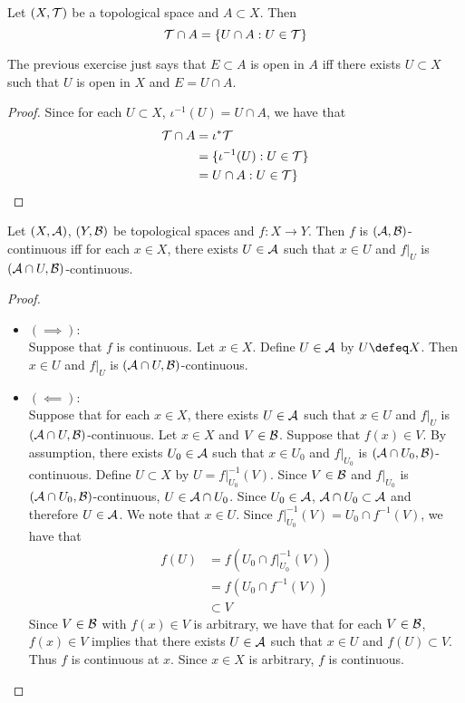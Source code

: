 \documentclass{book}
\begin{document}
\begin{ex}
	Let $(X, \mathcal{T})$ be a topological space and $A \subset X$. Then $$\mathcal{T} \cap A = \{U \cap A: U \in \mathcal{T}\}$$
\end{ex}

\begin{note}
	The previous exercise just says that $E \subset A$ is open in $A$ iff there exists $U \subset X$ such that $U$ is open in $X$ and $E = U \cap A$. 
\end{note}

\begin{proof}
	Since for each $U \subset X$, $\iota^{-1}(U) = U \cap A$, we have that 
	\begin{align*}
		\mathcal{T} \cap A
		& = \iota^* \mathcal{T} \\
		& = \{\iota^{-1}(U): U \in \mathcal{T}\} \\
		& = U \cap A: U \in \mathcal{T}\} \\
	\end{align*}
\end{proof}

\begin{ex}
	Let $(X, \mathcal{A})$, $(Y, \mathcal{B})$ be topological spaces and $f:X \rightarrow Y$. Then $f$ is $(\mathcal{A}, \mathcal{B})$-continuous iff for each $x \in X$, there exists $U \in \mathcal{A}$ such that $x \in U$ and $f|_U$ is $(\mathcal{A} \cap U, \mathcal{B})$-continuous.
\end{ex}

\begin{proof}\
	\begin{itemize}
		\item $(\implies)$: \\
		Suppose that $f$ is continuous. Let $x \in X$. Define $U \in \mathcal{A}$ by $U \defeq X$. Then $x \in U$ and $f|_U$ is $(\mathcal{A} \cap U, \mathcal{B})$-continuous. 
		\item $(\impliedby)$: \\
		Suppose that for each $x \in X$, there exists $U \in \mathcal{A}$ such that $x \in U$ and $f|_U$ is $(\mathcal{A} \cap U, \mathcal{B})$-continuous. Let $x \in X$ and $V \in \mathcal{B}$. Suppose that $f(x) \in V$. By assumption, there exists $U_0 \in \mathcal{A}$ such that $x \in U_0$ and $f|_{U_0}$ is $(\mathcal{A} \cap U_0, \mathcal{B})$-continuous. Define $U \subset X$ by $U = f|_{U_0}^{-1}(V)$. Since $V \in \mathcal{B}$ and $f|_{U_0}$ is $(\mathcal{A} \cap U_0, \mathcal{B})$-continuous, $U \in \mathcal{A} \cap U_0$. Since $U_0 \in \mathcal{A}$, $\mathcal{A} \cap U_0 \subset \mathcal{A}$ and therefore $U \in \mathcal{A}$. We note that $x \in U$. Since $f|_{U_0}^{-1}(V) = U_0 \cap f^{-1}(V)$, we have that 
		\begin{align*}
			f(U)
			& = f(U_0 \cap f|_{U_0}^{-1}(V)) \\
			& = f(U_0 \cap f^{-1}(V)) \\
			& \subset V
		\end{align*} 
		Since $V \in \mathcal{B}$ with $f(x) \in V$ is arbitrary, we have that for each $V \in \mathcal{B}$, $f(x) \in V$ implies that there exists $U \in \mathcal{A}$ such that $x \in U$ and $f(U) \subset V$. Thus $f$ is continuous at $x$. Since $x \in X$ is arbitrary, $f$ is continuous. 
	\end{itemize}
\end{proof}
\end{document}
